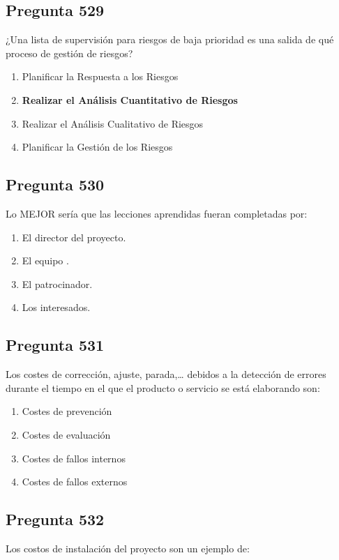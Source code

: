 \documentclass[11pt,a4paper]{article}
\begin{document}
\subsection*{Pregunta 529}
¿Una lista de supervisión para riesgos de baja prioridad es una salida de qué proceso de gestión de riesgos?

\begin{enumerate}[label=\alph*)]
  \item Planificar la Respuesta a los Riesgos
  \item \textbf{Realizar el Análisis Cuantitativo de Riesgos}
  \item Realizar el Análisis Cualitativo de Riesgos
  \item Planificar la Gestión de los Riesgos
\end{enumerate}

\subsection*{Pregunta 530}
Lo MEJOR sería que las lecciones aprendidas fueran completadas por:

\begin{enumerate}[label=\alph*)]
  \item El director del proyecto.
  \item El equipo .
  \item El patrocinador.
  \item Los interesados.
\end{enumerate}

\subsection*{Pregunta 531}
Los costes de corrección, ajuste, parada,… debidos a la detección de errores durante el tiempo en el que el producto o servicio se está elaborando son:

\begin{enumerate}[label=\alph*)]
  \item Costes de prevención
  \item Costes de evaluación
  \item Costes de fallos internos
  \item Costes de fallos externos
\end{enumerate}

\subsection*{Pregunta 532}
Los costos de instalación del proyecto son un ejemplo de:
\end{document}
